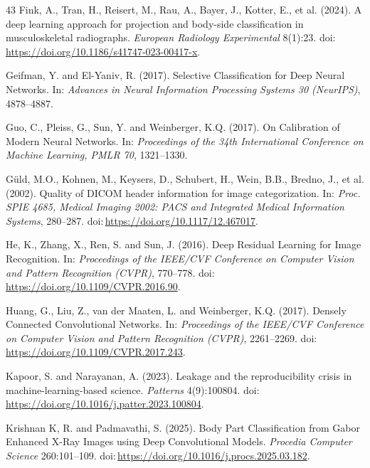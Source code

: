 \begin{thebibliography}{43}
Fink, A., Tran, H., Reisert, M., Rau, A., Bayer, J., Kotter, E., et al. (2024). A deep learning approach for projection and body-side classification in musculoskeletal radiographs. \textit{European Radiology Experimental} 8(1):23. doi:\,\url{https://doi.org/10.1186/s41747-023-00417-x}.

Geifman, Y. and El-Yaniv, R. (2017). Selective Classification for Deep Neural Networks. In: \textit{Advances in Neural Information Processing Systems 30 (NeurIPS)}, 4878--4887.

Guo, C., Pleiss, G., Sun, Y. and Weinberger, K.Q. (2017). On Calibration of Modern Neural Networks. In: \textit{Proceedings of the 34th International Conference on Machine Learning, PMLR 70}, 1321--1330.

G{\"u}ld, M.O., Kohnen, M., Keysers, D., Schubert, H., Wein, B.B., Bredno, J., et al. (2002). Quality of DICOM header information for image categorization. In: \textit{Proc. SPIE 4685, Medical Imaging 2002: PACS and Integrated Medical Information Systems}, 280--287. doi:\,\url{https://doi.org/10.1117/12.467017}.

He, K., Zhang, X., Ren, S. and Sun, J. (2016). Deep Residual Learning for Image Recognition. In: \textit{Proceedings of the IEEE/CVF Conference on Computer Vision and Pattern Recognition (CVPR)}, 770--778. doi:\,\url{https://doi.org/10.1109/CVPR.2016.90}.

Huang, G., Liu, Z., van der Maaten, L. and Weinberger, K.Q. (2017). Densely Connected Convolutional Networks. In: \textit{Proceedings of the IEEE/CVF Conference on Computer Vision and Pattern Recognition (CVPR)}, 2261--2269. doi:\,\url{https://doi.org/10.1109/CVPR.2017.243}.

Kapoor, S. and Narayanan, A. (2023). Leakage and the reproducibility crisis in machine-learning-based science. \textit{Patterns} 4(9):100804. doi:\,\url{https://doi.org/10.1016/j.patter.2023.100804}.

Krishnan K, R. and Padmavathi, S. (2025). Body Part Classification from Gabor Enhanced X-Ray Images using Deep Convolutional Models. \textit{Procedia Computer Science} 260:101--109. doi:\,\url{https://doi.org/10.1016/j.procs.2025.03.182}.


\end{thebibliography}
